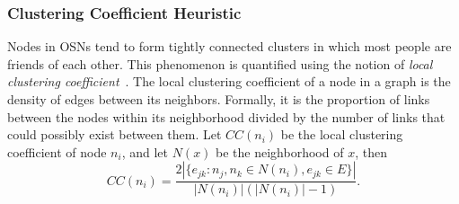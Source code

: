 \documentclass[prodmode,acmtecs]{acmsmall} %
\newcommand{\note}[2]{\textbf{\textsc{#1} says: \textit{#2}}}
\begin{document}


\subsubsection{Clustering Coefficient Heuristic}
Nodes in OSNs tend to form tightly connected clusters in which most people are friends of each other. This phenomenon is quantified using the notion of {\em local clustering coefficient}~\cite{clustering}. 
The local clustering coefficient of a node in a graph is the density of edges between its neighbors. Formally, it is the proportion of links between the nodes within its neighborhood divided by the number of links that could possibly exist between them. 
Let $CC(n_i)$ be the local clustering coefficient of node $n_i$, and let $N(x)$ be the neighborhood of $x$, then
\begin{equation}
CC(n_i) = \frac{2|\{e_{jk}: n_j,n_k \in N(n_i), e_{jk} \in E\}|}{|N(n_i)|(|N(n_i)|-1)}.
\end{equation}
\end{document}
